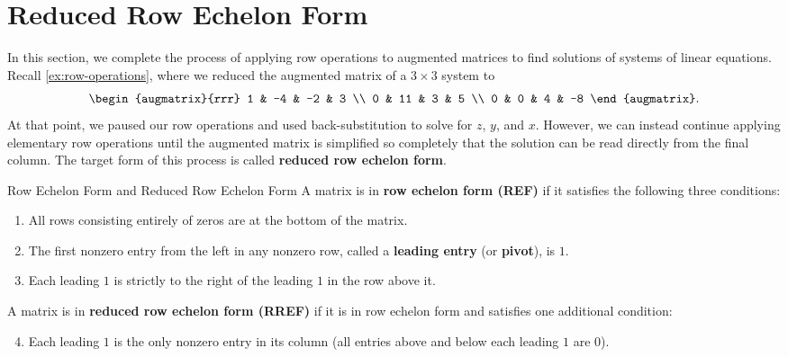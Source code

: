 \documentclass{article}
\begin{document}
\section{Reduced Row Echelon Form}\label{sec:RREF}

In this section, we complete the process of applying row operations to augmented matrices to find solutions of systems of linear equations. Recall \cref{ex:row-operations}, where we reduced the augmented matrix of a \(3\times 3\) system to
\[
\begin{augmatrix}{rrr}
1 & -4 & -2 & 3 \\
0 & 11 & 3 & 5 \\
0 & 0 & 4 & -8
\end{augmatrix}.
\]
At that point, we paused our row operations and used back-substitution to solve for \(z\), \(y\), and \(x\). However, we can instead continue applying elementary row operations until the augmented matrix is simplified so completely that the solution can be read directly from the final column. The target form of this process is called \textbf{reduced row echelon form}.

\begin{calloutbox}{Row Echelon Form and Reduced Row Echelon Form}
A matrix is in \textbf{row echelon form (REF)} if it satisfies the following three conditions:
\begin{enumerate}
    \item All rows consisting entirely of zeros are at the bottom of the matrix.
    \item The first nonzero entry from the left in any nonzero row, called a \textbf{leading entry} (or \textbf{pivot}), is \(1\).
    \item Each leading \(1\) is strictly to the right of the leading \(1\) in the row above it.
\end{enumerate}
A matrix is in \textbf{reduced row echelon form (RREF)} if it is in row echelon form and satisfies one additional condition:
\begin{enumerate}\setcounter{enumi}{3}
    \item Each leading \(1\) is the only nonzero entry in its column (all entries above and below each leading \(1\) are \(0\)).
\end{enumerate}
\end{calloutbox}
\end{document}
